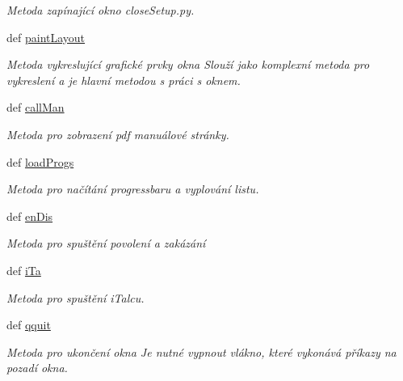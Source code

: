 \begin{DoxyCompactItemize}
\begin{DoxyCompactList}\small\item\em Metoda zapínající okno close\-Setup.\-py. \end{DoxyCompactList}\item 
def \hyperlink{classmnWindow_1_1App_a3a711688d2463a65d43a0a9dcc19276c}{paint\-Layout}
\begin{DoxyCompactList}\small\item\em Metoda vykreslující grafické prvky okna Slouží jako komplexní metoda pro vykreslení a je hlavní metodou s práci s oknem. \end{DoxyCompactList}\item 
def \hyperlink{classmnWindow_1_1App_a91341b90df0f9dde4e3ea9569d936e9c}{call\-Man}
\begin{DoxyCompactList}\small\item\em Metoda pro zobrazení pdf manuálové stránky. \end{DoxyCompactList}\item 
def \hyperlink{classmnWindow_1_1App_aa07a9b47b0fc8969a970edff8ecc1b56}{load\-Progs}
\begin{DoxyCompactList}\small\item\em Metoda pro načítání progressbaru a vyplování listu. \end{DoxyCompactList}\item 
def \hyperlink{classmnWindow_1_1App_a406244c1526206699c931f64fd7e1789}{en\-Dis}
\begin{DoxyCompactList}\small\item\em Metoda pro spuštění povolení a zakázání \end{DoxyCompactList}\item 
def \hyperlink{classmnWindow_1_1App_a52d48174831c728d5ee3e7f0684aadb3}{i\-Ta}
\begin{DoxyCompactList}\small\item\em Metoda pro spuštění i\-Talcu. \end{DoxyCompactList}\item 
def \hyperlink{classmnWindow_1_1App_a6db9e81dd9a0225e260c43852f6bdcc4}{qquit}
\begin{DoxyCompactList}\small\item\em Metoda pro ukončení okna Je nutné vypnout vlákno, které vykonává příkazy na pozadí okna. \end{DoxyCompactList}\end{DoxyCompactItemize}
